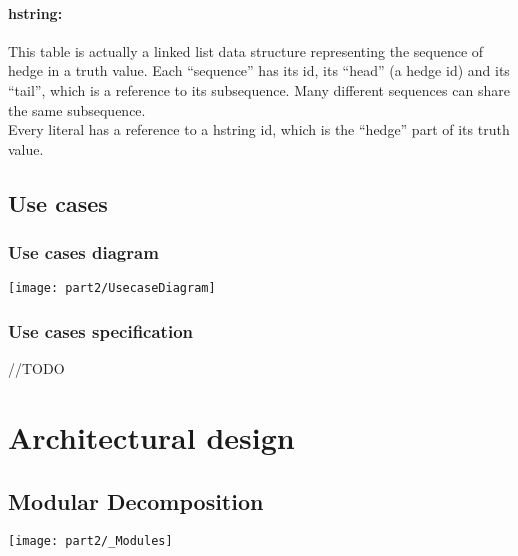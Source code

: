 \documentclass[../gr-final.tex]{subfiles}
\begin{document}
\paragraph{hstring:}
This table is actually a linked list data structure representing
the sequence of hedge in a truth value. Each ``sequence'' has its id,
its ``head'' (a hedge id) and its ``tail'', which is a reference to
its subsequence. Many different sequences can share the same
subsequence.\\
Every literal has a reference to a hstring id, which is the ``hedge'' part
of its truth value.
\subsection{Use cases}

\subsubsection{Use cases diagram}
\texttt{[image: part2/UsecaseDiagram]}

\subsubsection{Use cases specification}
{\huge //TODO}



\section{Architectural design}
\subsection{Modular Decomposition}
\texttt{[image: part2/\_Modules]}
\end{document}
